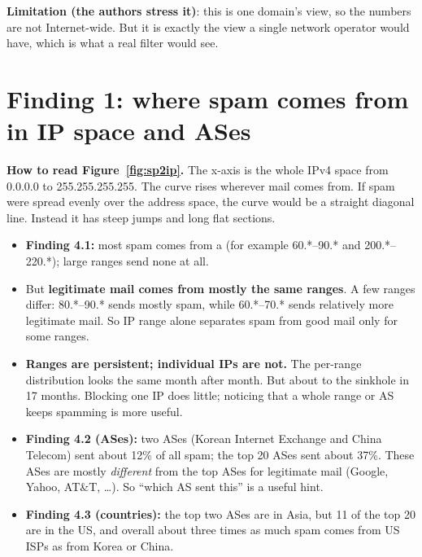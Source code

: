 \textbf{Limitation (the authors stress it)}: this is one domain's view, so the numbers are not Internet-wide. But it is exactly the view a
single network operator would have, which is what a real filter would see.

\section{Finding 1: where spam comes from in IP space and ASes}


\textbf{How to read Figure~\ref{fig:sp2ip}.} The x-axis is the whole IPv4 space from 0.0.0.0 to 255.255.255.255. The curve rises wherever mail
comes from. If spam were spread evenly over the address space, the curve would be a straight diagonal line. Instead it has steep jumps and long flat
sections.

\begin{itemize}
  \item \textbf{Finding 4.1:} most spam comes from a  (for example 60.*--90.* and 200.*--220.*); large ranges send
        none at all.
  \item But \textbf{legitimate mail comes from mostly the same ranges}. A few ranges differ: 80.*--90.* sends mostly spam, while 60.*--70.* sends
        relatively more legitimate mail. So IP range alone separates spam from good mail only for some ranges.
  \item \textbf{Ranges are persistent; individual IPs are not.} The per-range distribution looks the same month after month. But about
         to the sinkhole in 17 months. Blocking one IP does little; noticing that a whole
        range or AS keeps spamming is more useful.
  \item \textbf{Finding 4.2 (ASes):} two ASes (Korean Internet Exchange and China Telecom) sent about 12\% of all spam; the top 20 ASes sent about
        37\%. These ASes are mostly \emph{different} from the top ASes for legitimate mail (Google, Yahoo, AT\&T, \dots). So ``which AS sent
        this'' is a useful hint.
  \item \textbf{Finding 4.3 (countries):} the top two ASes are in Asia, but 11 of the top 20 are in the US, and overall about three times as much
        spam comes from US ISPs as from Korea or China.
\end{itemize}

